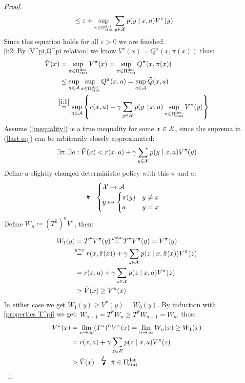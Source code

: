 \begin{proof}
\begin{align*}
		&\le \varepsilon + \sup_{\pi\in\Pi_{\textnormal{stat}}^{\textnormal{det}}} \sum_{y\in\mathcal{X}}p(y\mid x,a) V^\pi(y)
	\end{align*}
	Since this equation holds for all \(\varepsilon>0\) we are finished.
	\\
	\ref{i:2}
	By \ref{V^pi,Q^pi relation} we know \(V^\pi(x)=Q^\pi(x,\pi(x))\) thus:
	\begin{align}
		\tilde{V}(x)& =\sup_{\pi \in \detPolicy} V^\pi(x)
		=\sup_{\pi \in \detPolicy}Q^\pi(x,\pi(x)) 
		\nonumber\\
		&\le\sup_{a\in \cA} \sup_{\pi\in\detPolicy} Q^\pi(x,a)
		=\sup_{a\in \cA} \tilde{Q}(x,a)
		\label{inequality}
		\\
		&\lxeq{\ref{i:1}} \sup_{a\in \cA}\left\{ r(x,a)+\gamma\sum\limits_{y\in\cX}p(y\mid x,a) 
		\sup_{\pi\in\detPolicy} V^\pi(y) \right\} \label{last eq}
	\end{align}
	Assume (\ref{inequality}) is a true inequality for some \(x\in\mathcal{X}\), since the suprema in (\ref{last eq}) can be arbitrarily closely approximated:
	\[ \exists \pi, \exists a : \tilde{V}(x) < r(x,a) + \gamma\sum_{y\in\mathcal{X}} p(y\mid x,a) V^\pi(y)\]
	Define a slightly changed deterministic policy with this \(\pi\) and \(a\):
	\begin{align*}
		\hat{\pi}\colon
		\begin{cases}
			\mathcal{X}\to\mathcal{A}\\
			y\mapsto
			\begin{cases}
				\pi(y) & y\neq x\\
				a & y=x
			\end{cases}
		\end{cases}
	\end{align*}
	Define \(W_n\coloneqq (T^{\hat{\pi}})^n V^\pi\), then:
	\begin{align*}
		W_1(y)&=T^{\hat{\pi}}V^\pi(y) \xeq{y\neq x} T^\pi V^\pi(y) = V^\pi(y)\\
		&\lxeq{y=x} r(x, \hat{\pi}(x)) 
		+ \gamma \sum_{z\in\cX} p(z \mid x, \hat{\pi}(x)) V^\pi(z)  \\
		&=r(x, a) + \gamma \sum_{z\in\cX} p(z \mid x, a) V^\pi(z) \\
		&> \tilde{V}(x) \ge V^\pi(x)
	\end{align*}
	In either case we get \(W_1(y)\ge V^\pi(y)=W_0(y) \).
	By induction with \ref{properties T^pi} we get: \(W_{n+1}=T^{\hat{\pi}}W_n \ge T^{\hat{\pi}}W_{n-1}=W_n\), thus:
	\begin{align*}
		V^{\hat{\pi}}(x)&=\lim_{n\to\infty}(T^{\hat{\pi}})^n V^\pi(x)=\lim_{n\to\infty} W_n(x)\ge W_1(x) \\
		&=r(x, a) + \gamma \sum_{z\in\cX} p(z \mid x, a) V^\pi(z) \\
		&> \tilde{V}(x) \contradiction{\hat{\pi}\in\detPolicy}
	\end{align*}
\end{proof}



